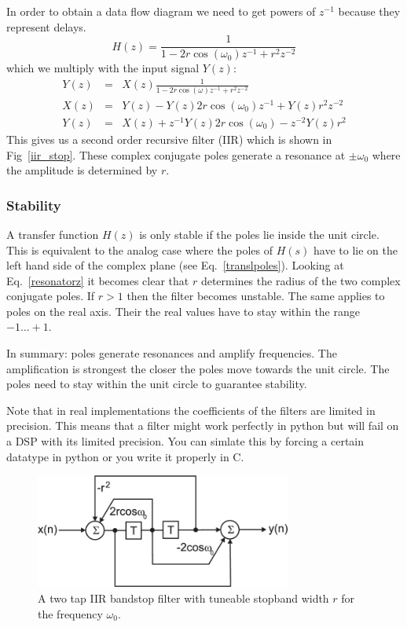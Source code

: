 \documentclass[12pt,a4paper]{article}
\begin{document}
In order to obtain a data flow diagram we need to get powers of $z^{-1}$
because they represent delays.
\begin{equation}
H(z) = \frac{1}{1 - 2 r \cos(\omega_{0}) z^{-1} + r^{2} z^{-2}} 
\end{equation}
which we multiply with the input signal $Y(z)$:
\begin{eqnarray} 
Y(z) & = & X(z) \frac{1}{1 - 2 r \cos (\omega) z^{-1} + r^{2} z^{-2}} \\
X(z) & = & Y(z) - Y(z) 2r \cos (\omega_{0}) z^{-1} + Y(z) r^{2} z^{-2} \\
Y(z) & = & X(z) + z^{-1} Y(z) 2r \cos (\omega_{0}) - z^{-2} Y(z) r^{2}
\end{eqnarray}
This gives us a second order recursive filter (IIR) which is
shown in Fig~\ref{iir_stop}. These complex
conjugate poles generate a resonance at $\pm\omega_0$ where the
amplitude is determined by $r$.

\subsubsection{Stability}
A transfer function $H(z)$ is only stable if the poles lie inside the
unit circle. This is equivalent to the analog case where the poles of
$H(s)$ have to lie on the left hand side of the complex plane (see
Eq.~\ref{translpoles}). Looking at Eq.~\ref{resonatorz} it becomes
clear that $r$ determines the radius of the two complex conjugate poles. If
$r>1$ then the filter becomes unstable. The same applies to poles on
the real axis. Their the real values have to stay within the range $-1
\ldots +1$.

In summary: poles generate resonances and amplify frequencies. The
amplification is strongest the closer the poles move towards the unit
circle. The poles need to stay within the unit circle to guarantee
stability. 

Note that in real implementations the coefficients of the
filters are limited in precision. This means that a filter might
work perfectly in python but will fail on a DSP with its limited
precision. You can simlate this by forcing a certain datatype
in python or you write it properly in C.

\begin{figure}[!hbt]
\begin{center}
\mbox{\includegraphics[width=0.75\textwidth]{iir_fir_stop}}
\end{center}
\caption{A two tap IIR bandstop filter with tuneable stopband width $r$
for the frequency $\omega_0$.
\label{iir_fir_stop}}
\end{figure}
\end{document}
